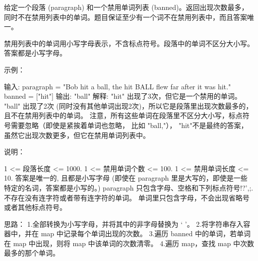 给定一个段落 (paragraph) 和一个禁用单词列表 (banned)。返回出现次数最多，同时不在禁用列表中的单词。题目保证至少有一个词不在禁用列表中，而且答案唯一。

禁用列表中的单词用小写字母表示，不含标点符号。段落中的单词不区分大小写。答案都是小写字母。

 

示例：

输入: 
paragraph = "Bob hit a ball, the hit BALL flew far after it was hit."
banned = ["hit"]
输出: "ball"
解释: 
"hit" 出现了3次，但它是一个禁用的单词。
"ball" 出现了2次 (同时没有其他单词出现2次)，所以它是段落里出现次数最多的，且不在禁用列表中的单词。 
注意，所有这些单词在段落里不区分大小写，标点符号需要忽略（即使是紧挨着单词也忽略， 比如 "ball,"）， 
"hit"不是最终的答案，虽然它出现次数更多，但它在禁用单词列表中。

 

说明：

    1 <= 段落长度 <= 1000.
    1 <= 禁用单词个数 <= 100.
    1 <= 禁用单词长度 <= 10.
    答案是唯一的, 且都是小写字母 (即使在 paragraph 里是大写的，即使是一些特定的名词，答案都是小写的。)
    paragraph 只包含字母、空格和下列标点符号!?',;.
    不存在没有连字符或者带有连字符的单词。
    单词里只包含字母，不会出现省略号或者其他标点符号。
































思路：
1.全部转换为小写字母，并将其中的非字母替换为 ‘ ’。
2.将字符串存入容器中，并在 map 中记录每个单词出现的次数。
3.遍历 banned 中的单词，若单词在 map 中出现，则将 map 中该单词的次数清零。
4.遍历 map，查找 map 中次数最多的那个单词。






























